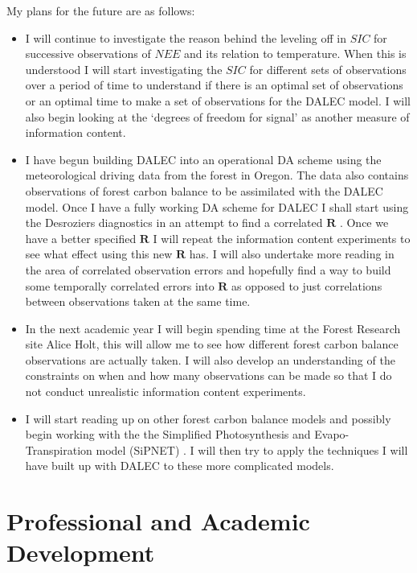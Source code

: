 \documentclass[11pt]{article}
\begin{document}
My plans for the future are as follows:

\begin{itemize}
\item I will continue to investigate the reason behind the leveling off in $SIC$ for successive observations of $NEE$ and its relation to temperature. When this is understood I will start investigating the $SIC$ for different sets of observations over a period of time to understand if there is an optimal set of observations or an optimal time to make a set of observations for the DALEC model. I will also begin looking at the `degrees of freedom for signal' \cite{rodgers2000inverse} as another measure of information content.

\item I have begun building DALEC into an operational DA scheme using the meteorological driving data from the forest in Oregon. The data also contains observations of forest carbon balance to be assimilated with the DALEC model. Once I have a fully working DA scheme for DALEC I shall start using the Desroziers diagnostics in an attempt to find a correlated $\textbf{R}$ \cite{desroziers2005diagnosis}. Once we have a better specified $\textbf{R}$ I will repeat the information content experiments to see what effect using this new $\textbf{R}$ has. I will also undertake more reading in the area of correlated observation errors and hopefully find a way to build some temporally correlated errors into $\textbf{R}$ as opposed to just correlations between observations taken at the same time.  

\item In the next academic year I will begin spending time at the Forest Research site Alice Holt, this will allow me to see how different forest carbon balance observations are actually taken. I will also develop an understanding of the constraints on when and how many observations can be made so that I do not conduct unrealistic information content experiments.  

\item I will start reading up on other forest carbon balance models and possibly begin working with the the Simplified Photosynthesis and Evapo-Transpiration model (SiPNET) \cite{braswell2005estimating}. I will then try to apply the techniques I will have built up with DALEC to these more complicated models.
\end{itemize}

\section*{Professional and Academic Development}
\end{document}
